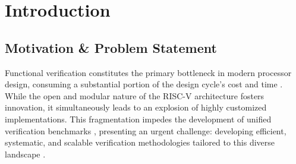 \documentclass[sigconf]{acmart}
\begin{document}





\maketitle

\section{Introduction}\label{Sec1}

\subsection{Motivation \& Problem Statement}

Functional verification constitutes the primary bottleneck in modern processor design, consuming a substantial portion of the design cycle's cost and time \cite{1}. While the open and modular nature of the RISC-V architecture fosters innovation, it simultaneously leads to an explosion of highly customized implementations. This fragmentation impedes the development of unified verification benchmarks \cite{2}, presenting an urgent challenge: developing efficient, systematic, and scalable verification methodologies tailored to this diverse landscape \cite{17}.
\end{document}
